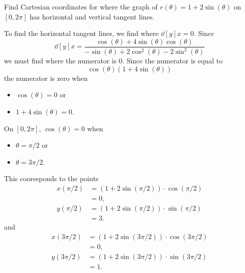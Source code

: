 \documentclass{ximera}
\begin{document}
\begin{example}
Find Cartesian coordinates for where the graph of $r(\theta)
=1+2\sin(\theta)$ on $[0,2\pi]$ has horizontal and vertical tangent
lines.
\begin{explanation}
  To find the horizontal tangent lines, we find where $\dd[y]{x}=0$.
  Since
  \[
  \dd[y]{x} =\frac{\cos(\theta) + 4\sin(\theta)\cos(\theta)}{-\sin(\theta) + 2\cos^2(\theta)-2\sin^2(\theta)}
  \]
  we must find where the numerator is $0$. Since the numerator is equal to
  \[
  \cos(\theta)(1+ 4\sin(\theta))
  \]
  the numerator is zero when 
  \begin{itemize}
  \item $\cos(\theta)=0$ or
  \item $1+4\sin(\theta)=0$.
  \end{itemize}
  On $[0,2\pi]$, $\cos(\theta)=0$ when
  \begin{itemize}
  \item $\theta=\pi/2$ or
  \item $\theta= 3\pi/2$.
  \end{itemize}
  This cooresponds to the points
  \begin{align*}
    x(\pi/2) &= \left(1+2\sin(\pi/2)\right)\cdot\cos(\pi/2)\\
    &= 0,\\
    y(\pi/2) &= \left(1+2\sin(\pi/2)\right)\cdot\sin(\pi/2)\\
    &= 3.
  \end{align*}
  and
  \begin{align*}
    x(3\pi/2) &= \left(1+2\sin(3\pi/2)\right)\cdot\cos(3\pi/2)\\
    &= 0,\\
    y(3\pi/2) &= \left(1+2\sin(3\pi/2)\right)\cdot\sin(3\pi/2)\\
    &= 1.
  \end{align*}
  

\end{explanation}
\end{example}
\end{document}
